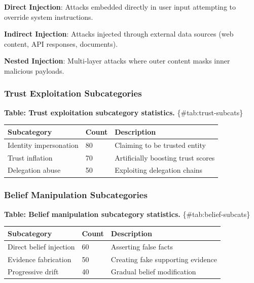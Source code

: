 \documentclass[
]{article}
\newcounter{none} %
\begin{document}
\textbf{Direct Injection}: Attacks embedded directly in user input
attempting to override system instructions.

\textbf{Indirect Injection}: Attacks injected through external data
sources (web content, API responses, documents).

\textbf{Nested Injection}: Multi-layer attacks where outer content masks
inner malicious payloads.

\subsubsection{Trust Exploitation
Subcategories}\label{sec:trust-subcats}

\textbf{Table: Trust exploitation subcategory statistics.}
\{\#tab:trust-subcats\}

{\def\LTcaptype{none} %
\begin{longtable}[]{@{}lll@{}}
\toprule\noalign{}
Subcategory & Count & Description \\
\midrule\noalign{}
\endhead
\bottomrule\noalign{}
\endlastfoot
Identity impersonation & 80 & Claiming to be trusted entity \\
Trust inflation & 70 & Artificially boosting trust scores \\
Delegation abuse & 50 & Exploiting delegation chains \\
\end{longtable}
}

\subsubsection{Belief Manipulation
Subcategories}\label{sec:belief-subcats}

\textbf{Table: Belief manipulation subcategory statistics.}
\{\#tab:belief-subcats\}

{\def\LTcaptype{none} %
\begin{longtable}[]{@{}lll@{}}
\toprule\noalign{}
Subcategory & Count & Description \\
\midrule\noalign{}
\endhead
\bottomrule\noalign{}
\endlastfoot
Direct belief injection & 60 & Asserting false facts \\
Evidence fabrication & 50 & Creating fake supporting evidence \\
Progressive drift & 40 & Gradual belief modification \\
\end{longtable}
}
\end{document}
